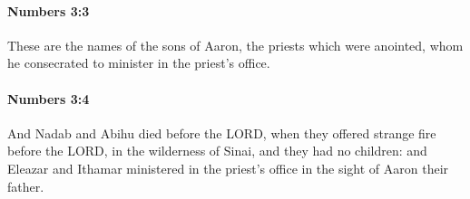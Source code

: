 		\paragraph{Numbers 3:3} %
			\label{NUMBERS-3-3}

			These are the names of the sons of Aaron, the priests which were anointed, whom he consecrated to minister in the priest’s office.


		\paragraph{Numbers 3:4} %
			\label{NUMBERS-3-4}

			And Nadab and Abihu died before the LORD, when they offered strange fire before the LORD, in the wilderness of Sinai, and they had no children: and Eleazar and Ithamar ministered in the priest’s office in the sight of Aaron their father.


